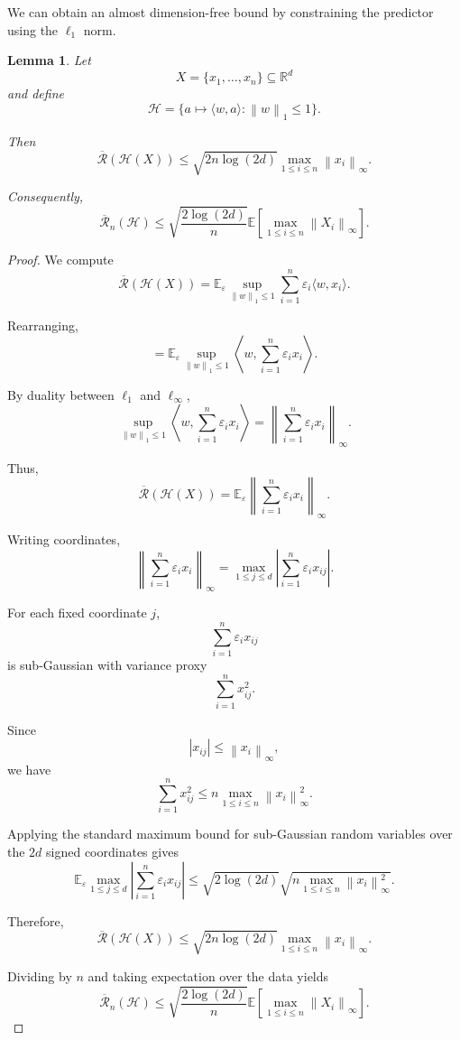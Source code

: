 \documentclass[12pt,oneside]{book}
\numberwithin{equation}{section}
\theoremstyle{definition}
\theoremstyle{plain}
\newtheorem{lemma}{Lemma}[section]
\theoremstyle{remark}
\newcommand{\R}{\mathbb{R}}
\newcommand{\E}{\mathbb{E}}
\newcommand{\norm}[1]{\left\lVert #1 \right\rVert}
\begin{document}
We can obtain an almost dimension-free bound by constraining the predictor using the $\ell_1$ norm.

\begin{lemma}
Let
\[
X=\{x_1,\dots,x_n\}\subseteq\R^d
\]
and define
\[
\mathcal{H}
=
\{a\mapsto \langle w,a\rangle:\norm{w}_1\leq 1\}.
\]

Then
\[
\overline{\mathcal{R}}(\mathcal{H}(X))
\leq
\sqrt{2n\log(2d)}
\max_{1\leq i\leq n}\norm{x_i}_{\infty}.
\]

Consequently,
\[
\overline{\mathcal{R}}_n(\mathcal{H})
\leq
\sqrt{\frac{2\log(2d)}{n}}
\E\left[
\max_{1\leq i\leq n}\norm{X_i}_{\infty}
\right].
\]
\end{lemma}

\begin{proof}
We compute
\[
\overline{\mathcal{R}}(\mathcal{H}(X))
=
\E_\varepsilon
\sup_{\norm{w}_1\leq1}
\sum_{i=1}^n
\varepsilon_i\langle w,x_i\rangle.
\]

Rearranging,
\[
=
\E_\varepsilon
\sup_{\norm{w}_1\leq1}
\left\langle
w,
\sum_{i=1}^n\varepsilon_i x_i
\right\rangle.
\]

By duality between $\ell_1$ and $\ell_\infty$,
\[
\sup_{\norm{w}_1\leq1}
\left\langle
w,
\sum_{i=1}^n\varepsilon_i x_i
\right\rangle
=
\left\|
\sum_{i=1}^n\varepsilon_i x_i
\right\|_\infty.
\]

Thus,
\[
\overline{\mathcal{R}}(\mathcal{H}(X))
=
\E_\varepsilon
\left\|
\sum_{i=1}^n\varepsilon_i x_i
\right\|_\infty.
\]

Writing coordinates,
\[
\left\|
\sum_{i=1}^n\varepsilon_i x_i
\right\|_\infty
=
\max_{1\leq j\leq d}
\left|
\sum_{i=1}^n\varepsilon_i x_{ij}
\right|.
\]

For each fixed coordinate $j$,
\[
\sum_{i=1}^n\varepsilon_i x_{ij}
\]
is sub-Gaussian with variance proxy
\[
\sum_{i=1}^n x_{ij}^2.
\]

Since
\[
|x_{ij}|\leq \norm{x_i}_\infty,
\]
we have
\[
\sum_{i=1}^n x_{ij}^2
\leq
n\max_{1\leq i\leq n}\norm{x_i}_\infty^2.
\]

Applying the standard maximum bound for sub-Gaussian random variables over the $2d$ signed coordinates gives
\[
\E_\varepsilon
\max_{1\leq j\leq d}
\left|
\sum_{i=1}^n\varepsilon_i x_{ij}
\right|
\leq
\sqrt{2\log(2d)}
\sqrt{
n\max_{1\leq i\leq n}\norm{x_i}_\infty^2
}.
\]

Therefore,
\[
\overline{\mathcal{R}}(\mathcal{H}(X))
\leq
\sqrt{2n\log(2d)}
\max_{1\leq i\leq n}\norm{x_i}_\infty.
\]

Dividing by $n$ and taking expectation over the data yields
\[
\overline{\mathcal{R}}_n(\mathcal{H})
\leq
\sqrt{\frac{2\log(2d)}{n}}
\E\left[
\max_{1\leq i\leq n}\norm{X_i}_\infty
\right].
\]
\end{proof}
\end{document}
